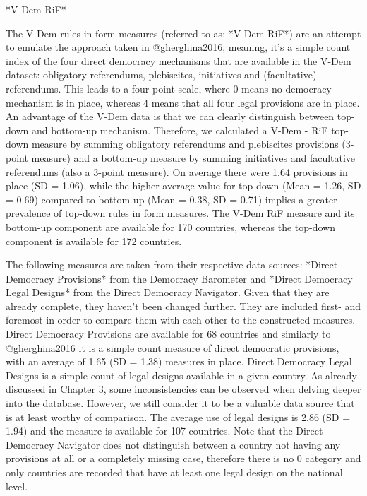 \documentclass{systats}
\begin{document}
*V-Dem RiF*

The V-Dem rules in form measures (referred to as: *V-Dem RiF*)  are an attempt to emulate the approach taken in @gherghina2016, meaning, it’s a simple count index of the four direct democracy mechanisms that are available in the V-Dem dataset: obligatory referendums, plebiscites, initiatives and (facultative) referendums. This leads to a four-point scale, where 0 means no democracy mechanism is in place, whereas 4 means that all four legal provisions are in place. An advantage of the V-Dem data is that we can clearly distinguish between top-down and bottom-up mechanism. Therefore, we calculated a V-Dem - RiF top-down measure by summing obligatory referendums and plebiscites provisions (3-point measure) and a bottom-up measure by summing initiatives and facultative referendums (also a 3-point measure). On average there were 1.64 provisions in place (SD = 1.06), while the higher average value for top-down (Mean = 1.26, SD = 0.69) compared to bottom-up  (Mean = 0.38, SD = 0.71) implies a greater prevalence of top-down rules in form measures. The V-Dem RiF measure and its bottom-up component are available for 170 countries, whereas the top-down component is available for 172 countries.

The following measures are taken from their respective data sources: *Direct Democracy Provisions* from the Democracy Barometer and *Direct Democracy Legal Designs* from the Direct Democracy Navigator. Given that they are already complete, they haven’t been changed further. They are included first- and foremost in order to compare them with each other to the constructed measures. Direct Democracy Provisions are available for 68 countries and similarly to @gherghina2016 it is a simple count measure of direct democratic provisions, with an average of 1.65 (SD = 1.38) measures in place.  Direct Democracy Legal Designs is a simple count of legal designs available in a given country. As already discussed in Chapter 3, some inconsistencies can be observed when delving deeper into the database. However, we still consider it to be a valuable data source that is at least worthy of comparison. The average use of legal designs is 2.86 (SD = 1.94) and the measure is available for 107 countries. Note that the Direct Democracy Navigator does not distinguish between a country not having any provisions at all or a completely missing case, therefore there is no 0 category and only countries are recorded that have at least one legal design on the national level.
\end{document}
